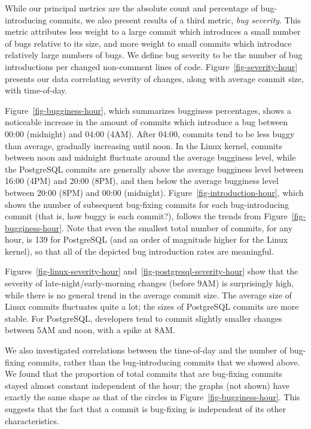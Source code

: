 While our principal metrics are the absolute count and percentage of
bug-introducing commits, we also present results of a third metric, \emph{bug
  severity}. This metric attributes less weight to a large commit which
introduces a small number of bugs relative to its size, and more weight to small
commits which introduce relatively large numbers of bugs. We define bug severity
to be the number of bug introductions per changed non-comment lines of
code. Figure~\ref{fig-severity-hour} presents our data correlating severity of
changes, along with average commit size, with time-of-day.

Figure~\ref{fig-bugginess-hour}, which summarizes bugginess percentages, shows a
noticeable increase in the amount of commits which introduce a bug between 00:00
(midnight) and 04:00 (4AM). After 04:00, commits tend to be less buggy than
average, gradually increasing until noon.  In the Linux kernel, commits between
noon and midnight fluctuate around the average bugginess level, while the
PostgreSQL commits are generally above the average bugginess level between 16:00
(4PM) and 20:00 (8PM), and then below the average bugginess level between 20:00
(8PM) and 00:00 (midnight). Figure~\ref{fig-introduction-hour}, which shows the
number of subsequent bug-fixing commits for each bug-introducing commit (that
is, how buggy is each commit?), follows the trends from
Figure~\ref{fig-bugginess-hour}. Note that even the smallest total number of
commits, for any hour, is 139 for PostgreSQL (and an order of magnitude higher
for the Linux kernel), so that all of the depicted bug introduction rates are
meaningful.

Figures~\ref{fig-linux-severity-hour} and~\ref{fig-postgresql-severity-hour}
show that the severity of late-night/early-morning changes (before 9AM) is
surprisingly high, while there is no general trend in the average commit size.
The average size of Linux commits fluctuates quite a lot; the sizes of
PostgreSQL commits are more stable.  For PostgreSQL, developers tend to commit
slightly smaller changes between 5AM and noon, with a spike at 8AM.

We also investigated correlations between the time-of-day and the number of
bug-fixing commits, rather than the bug-introducing commits that we showed
above. We found that the proportion of total commits that are bug-fixing commits
stayed almost constant independent of the hour; the graphs (not shown) have
exactly the same shape as that of the circles in
Figure~\ref{fig-bugginess-hour}.  This suggests that the fact that a commit is
bug-fixing is independent of its other characteristics.

